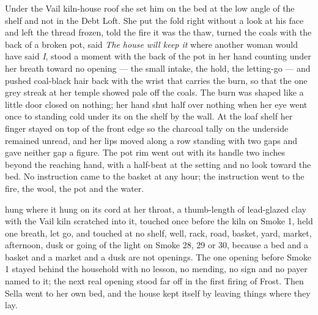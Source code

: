 Under the Vail kiln-house roof she set him on the bed at the low angle of the shelf and not in the Debt Loft. She put the fold right without a look at his face and left the thread frozen, told the fire it was the thaw, turned the coals with the back of a broken pot, said \emph{The house will keep it} where another woman would have said \emph{I}, stood a moment with the back of the pot in her hand counting under her breath toward no opening --- the small intake, the hold, the letting-go --- and pushed coal-black hair back with the wrist that carries the burn, so that the one grey streak at her temple showed pale off the coals. The burn was shaped like a little door closed on nothing; her hand shut half over nothing when her eye went once to  standing cold under its  on the shelf by the wall. At the loaf shelf her finger stayed on top of the front edge so the charcoal tally on the underside remained unread, and her lips moved along a row standing with two gaps and gave neither gap a figure. The pot rim went out with its handle two inches beyond the reaching hand, with a half-beat at the setting and no look toward the bed. No instruction came to the basket at any hour; the instruction went to the fire, the wool, the pot and the water.

 hung where it hung on its cord at her throat, a thumb-length of lead-glazed clay with the Vail kiln scratched into it, touched once before the kiln on Smoke 1, held one breath, let go, and touched at no shelf, well, rack, road, basket, yard, market, afternoon, dusk or going of the light on Smoke 28, 29 or 30, because a bed and a basket and a market and a dusk are not openings. The one opening before Smoke 1 stayed behind the household with no lesson, no mending, no sign and no payer named to it; the next real opening stood far off in the first firing of Frost. Then Sella went to her own bed, and the house kept itself by leaving things where they lay.

\scenebreak

